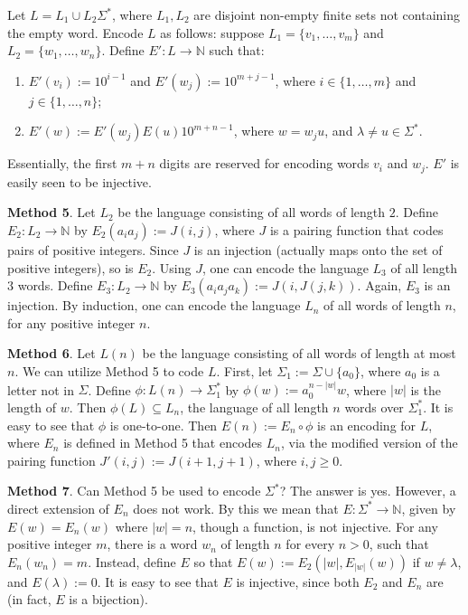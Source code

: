 \documentclass[12pt]{article}
\begin{document}
Let $L=L_1 \cup L_2 \Sigma^*$, where $L_1,L_2$ are disjoint non-empty finite sets not containing the empty word.   Encode $L$ as follows: suppose $L_1 =\lbrace v_1, \ldots, v_m \rbrace$ and $L_2=\lbrace w_1, \ldots, w_n \rbrace$.  Define $E': L \to \mathbb{N}$ such that:
\begin{enumerate}
\item $E'(v_i):= 10^{i-1}$ and $E'(w_j):= 10^{m+j-1}$, where $i\in \lbrace 1,\ldots, m \rbrace$ and $j\in \lbrace 1,\ldots, n \rbrace$;
\item $E'(w):= E'(w_j)E(u)10^{m+n-1}$, where $w=w_j u$, and $\lambda \ne u \in \Sigma^*$.
\end{enumerate}
Essentially, the first $m+n$ digits are reserved for encoding words $v_i$ and $w_j$.  $E'$ is easily seen to be injective.

\textbf{Method 5}.  Let $L_2$ be the language consisting of all words of length $2$.  Define $E_2:L_2\to \mathbb{N}$ by $E_2(a_i a_j):= J(i,j)$, where $J$ is a pairing function that codes pairs of positive integers.  Since $J$ is an injection (actually maps onto the set of positive integers), so is $E_2$.  Using $J$, one can encode the language $L_3$ of all length $3$ words.  Define $E_3: L_2 \to \mathbb{N}$ by $E_3(a_i a_j a_k):= J(i,J(j,k))$.  Again, $E_3$ is an injection.  By induction, one can encode the language $L_n$ of all words of length $n$, for any positive integer $n$.

\textbf{Method 6}.  Let $L(n)$ be the language consisting of all words of length at most $n$.  We can utilize Method 5 to code $L$.  First, let $\Sigma_1:=\Sigma \cup \lbrace a_0\rbrace$, where $a_0$ is a letter not in $\Sigma$.  Define $\phi: L(n)\to \Sigma_1^*$ by $\phi(w):= a_0^{n-|w|} w$, where $|w|$ is the length of $w$.  Then $\phi(L)\subseteq L_n$, the language of all length $n$ words over $\Sigma_1^*$.  It is easy to see that $\phi$ is one-to-one.  Then $E(n):=E_n \circ \phi$ is an encoding for $L$, where $E_n$ is defined in Method 5 that encodes $L_n$, via the modified version of the pairing function $J'(i,j):=J(i+1,j+1)$, where $i,j\ge 0$.

\textbf{Method 7}.  Can Method 5 be used to encode $\Sigma^*$?  The answer is yes.  However, a direct extension of $E_n$ does not work.  By this we mean that $E:\Sigma^* \to \mathbb{N}$, given by $E(w)=E_n(w)$ where $|w|=n$, though a function, is not injective.  For any positive integer $m$, there is a word $w_n$ of length $n$ for every $n>0$, such that $E_n(w_n)=m$.  Instead, define $E$ so that $E(w):=E_2(|w|,E_{|w|}(w))$ if $w\ne \lambda$, and $E(\lambda):=0$.  It is easy to see that $E$ is injective, since both $E_2$ and $E_n$ are (in fact, $E$ is a bijection).
\end{document}
